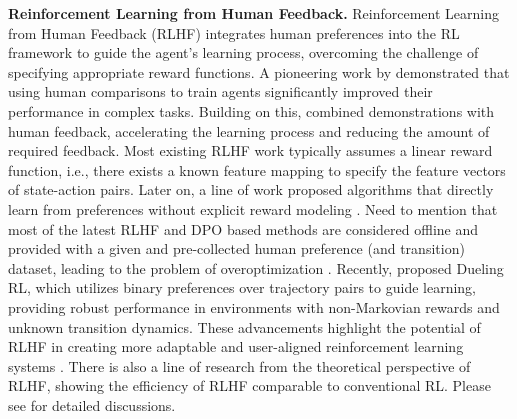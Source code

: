 \documentclass{article} %
\begin{document}
\textbf{Reinforcement Learning from Human Feedback.}
Reinforcement Learning from Human Feedback (RLHF) integrates human preferences into the RL framework to guide the agent's learning process, overcoming the challenge of specifying appropriate reward functions. A pioneering work by \cite{christiano2017deep} demonstrated that using human comparisons to train agents significantly improved their performance in complex tasks. Building on this, \cite{ibarz2018reward} combined demonstrations with human feedback, accelerating the learning process and reducing the amount of required feedback. 
Most existing RLHF work \citep{chen2022human,zhu2023principled,du2024exploration} typically assumes a linear reward function, i.e., there exists a known feature mapping to specify the feature vectors of state-action pairs. Later on, a line of work proposed algorithms that directly learn from preferences without explicit reward modeling \citep{rafailov2024direct, zhao2023slic,azar2024general,ethayarajh2024kto,tang2024generalized}.
Need to mention that  most of the latest RLHF and DPO based methods are considered offline and provided with a given and pre-collected human preference (and transition) dataset, leading to the problem of overoptimization \citep{xiong2023iterative}.
Recently, \cite{saha2023dueling} proposed Dueling RL, which utilizes binary preferences over trajectory pairs to guide learning, providing robust performance in environments with non-Markovian rewards and unknown transition dynamics. These advancements highlight the potential of RLHF in creating more adaptable and user-aligned reinforcement learning systems \citep{rafailov2024direct}. There is also a line of research from the theoretical perspective of RLHF, showing the efficiency of RLHF comparable to conventional RL. Please see \cite{wang2024rlhf} for detailed discussions.
\end{document}
